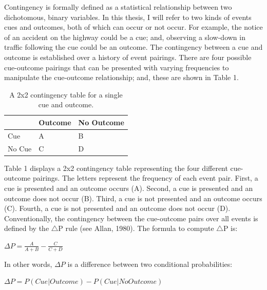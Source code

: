 \documentclass[
  english,
  man,floatsintext]{apa6}
\begin{document}
Contingency is formally defined as a statistical relationship between two dichotomous, binary variables. In this thesis, I will refer to two kinds of events cues and outcomes, both of which can occur or not occur. For example, the notice of an accident on the highway could be a cue; and, observing a slow-down in traffic following the cue could be an outcome. The contingency between a cue and outcome is established over a history of event pairings. There are four possible cue-outcome pairings that can be presented with varying frequencies to manipulate the cue-outcome relationship; and, these are shown in Table 1.



\begin{table}[tbp]

\begin{center}
\begin{threeparttable}

\caption{\label{tab:contingencytable}A 2x2 contingency table for a single cue and outcome.}

\begin{tabular}{lll}
\toprule
 & \multicolumn{1}{c}{Outcome} & \multicolumn{1}{c}{No Outcome}\\
\midrule
Cue & A & B\\
No Cue & C & D\\
\bottomrule
\end{tabular}

\end{threeparttable}
\end{center}

\end{table}

Table 1 displays a 2x2 contingency table representing the four different cue-outcome pairings. The letters represent the frequency of each event pair. First, a cue is presented and an outcome occurs (A). Second, a cue is presented and an outcome does not occur (B). Third, a cue is not presented and an outcome occurs (C). Fourth, a cue is not presented and an outcome does not occur (D). Conventionally, the contingency between the cue-outcome pairs over all events is defined by the \(\triangle\)P rule (see Allan, 1980). The formula to compute \(\triangle\)P is:

\(\Delta P = \frac{A}{A+B} - \frac{C}{C+D}\)

In other words, \(\Delta P\) is a difference between two conditional probabilities:

\(\Delta P = P(Cue|Outcome) - P(Cue|No Outcome)\)
\end{document}
